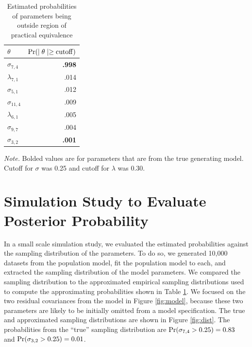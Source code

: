 \documentclass[man, noextraspace, floatsintext, 12pt]{apa7}
\begin{document}
\begin{table}[ht]
\centering
\begin{threeparttable}
\caption{Estimated probabilities of parameters being outside region of practical equivalence}
\label{tb:prob}
\begin{tabular}{lr}
  \toprule
$\theta$ & $\mathrm{Pr}( \mid \theta \mid \geq {\rm cutoff})$\\ 
  \midrule
  	$\sigma_{7, 4}$ & \textbf{.998}\\ 
	$\lambda_{7, 1}$ &	.014\\
	$\sigma_{5,1}$ &	.012\\
	$\sigma_{11, 4}$ &	.009\\
	$\lambda_{6, 1}$ &	.005\\
	$\sigma_{9, 7}$ &	.004\\
	$\sigma_{3, 2}$ &	\textbf{.001}\\   \bottomrule
\end{tabular}
\vspace*{1mm}
 	\begin{tablenotes}
    {\small
        \textit{Note.} Bolded values are for parameters that are from the true generating model. Cutoff for $\sigma$ was 0.25 and cutoff for $\lambda$ was 0.30.
    }
 	\end{tablenotes}
 \end{threeparttable}
\end{table}


\section{Simulation Study to Evaluate Posterior Probability}

In a small scale simulation study, we evaluated the estimated probabilities against the sampling distribution of the parameters.
To do so, we generated 10,000 datasets from the population model, fit the population model to each, and extracted the sampling distribution of the model parameters.
We compared the sampling distribution to the approximated empirical sampling distributions used to compute the approximating probabilities shown in Table \ref{tb:prob}.
We focused on the two residual covariances from the model in Figure \ref{fig:model}, because these two parameters are likely to be initially omitted from a model specification.
The true and approximated sampling distributions are shown in Figure \ref{fig:dist}.
The probabilities from the ``true'' sampling distribution are ${\rm Pr}(\sigma_{7,4} > 0.25) = 0.83$ and ${\rm Pr}(\sigma_{3,2} > 0.25) = 0.01$.
\end{document}
